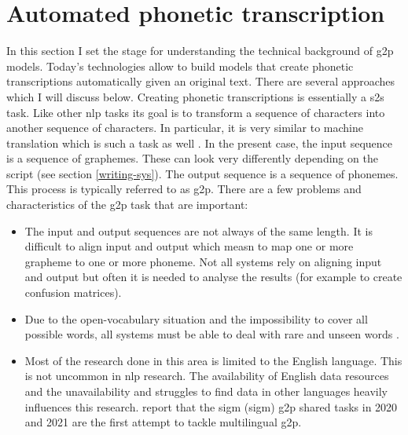 \section{Automated phonetic transcription}
\label{model_theory}
In this section I set the stage for understanding the technical background of \ac{g2p} models. Today's technologies allow to build models that create phonetic transcriptions automatically given an original text. There are several approaches which I will discuss below. Creating phonetic transcriptions is essentially a \acf{s2s} task. Like other \ac{nlp} tasks its goal is to transform a sequence of characters into another sequence of characters. In particular, it is very similar to machine translation which is such a task as well \citep{Rao2015GraphemetophonemeCU}. In the present case, the input sequence is a sequence of graphemes. These can look very differently depending on the script (see section \ref{writing-sys}). The output sequence is a sequence of phonemes. This process is typically referred to as \acf{g2p}. There are a few problems and characteristics of the \ac{g2p} task that are important:

\begin{itemize}
\item The input and output sequences are not always of the same length. It is difficult to align input and output which measn to map one or more grapheme to one or more phoneme. Not all systems rely on aligning input and output but often it is needed to analyse the results (for example to create confusion matrices). 
\item Due to the open-vocabulary situation and the impossibility to cover all possible words, all systems must be able to deal with rare and unseen words \citep{Rao2015GraphemetophonemeCU, ney-joint-sequence2008}. 
\item Most of the research done in this area is limited to the English language. This is not uncommon in \ac{nlp} research. The availability of English data resources and the unavailability and struggles to find data in other languages heavily influences this research. \citet{Ashby-Bartley.2021} report that the \acs{sigm} (\acl{sigm}) \ac{g2p} shared tasks in 2020 and 2021 are the first attempt to tackle multilingual \ac{g2p}.
\end{itemize}

